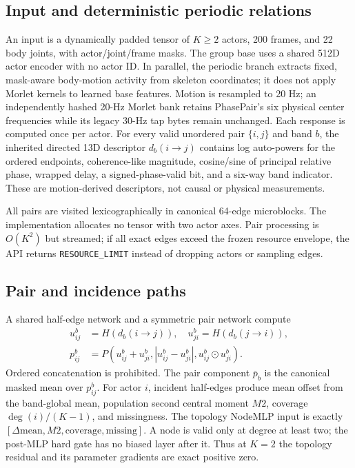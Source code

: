 \documentclass{article}
\begin{document}
\subsection{Input and deterministic periodic relations}
An input is a dynamically padded tensor of $K\!\geq\!2$ actors, 200 frames,
and 22 body joints, with actor/joint/frame masks. The group base uses a shared
512D actor encoder with no actor ID. In parallel, the periodic branch extracts
fixed, mask-aware body-motion activity from skeleton coordinates; it does not
apply Morlet kernels to learned base features. Motion is resampled to 20 Hz;
an independently hashed 20-Hz
Morlet bank retains PhasePair's six physical center frequencies while its
legacy 30-Hz tap bytes remain unchanged. Each response is computed once per actor. For every
valid unordered pair $\{i,j\}$ and band $b$, the inherited directed 13D
descriptor $d_b(i{\to}j)$ contains log auto-powers for the ordered endpoints,
coherence-like magnitude, cosine/sine of principal relative phase, wrapped
delay, a signed-phase-valid bit, and a six-way band indicator. These are
motion-derived descriptors, not causal or physical measurements.

All pairs are visited lexicographically in canonical 64-edge microblocks. The
implementation allocates no tensor with two actor axes. Pair processing is
$O(K^2)$ but streamed; if all exact edges exceed the frozen resource envelope,
the API returns \texttt{RESOURCE\_LIMIT} instead of dropping actors or sampling
edges.

\subsection{Pair and incidence paths}
A shared half-edge network and a symmetric pair network compute
\begin{equation}
\begin{split}
u_{ij}^{b}&=H(d_b(i{\to}j)),\quad u_{ji}^{b}=H(d_b(j{\to}i)),\\
p_{ij}^{b}&=P\!\left(u_{ij}^{b}+u_{ji}^{b},
 |u_{ij}^{b}-u_{ji}^{b}|,u_{ij}^{b}\odot u_{ji}^{b}\right).
\end{split}
\label{eq:pair}
\end{equation}
Ordered concatenation is prohibited. The pair component $\bar p_b$ is the
canonical masked mean over $p_{ij}^{b}$. For actor $i$, incident half-edges
produce mean offset from the band-global mean, population second central
moment $M2$, coverage $\deg(i)/(K-1)$, and missingness. The topology NodeMLP
input is exactly $[\Delta\mathrm{mean},M2,\mathrm{coverage},\mathrm{missing}]$.
A node is valid only at degree at least two; the post-MLP hard gate has no
biased layer after it. Thus at $K{=}2$ the topology residual and its parameter
gradients are exact positive zero.
\end{document}
